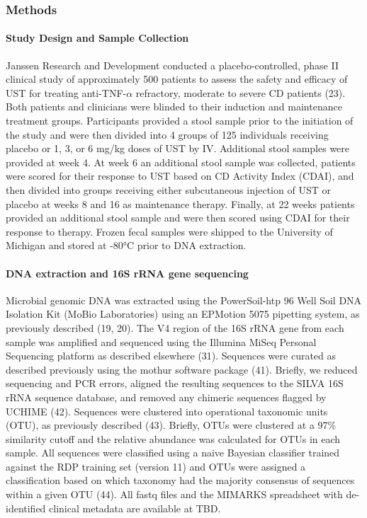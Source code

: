 \documentclass[11pt,]{article}
\let\oldparagraph\paragraph
\renewcommand{\paragraph}[1]{\oldparagraph{#1}\mbox{}}
\begin{document}
\newpage

\subsubsection{Methods}\label{methods}

\paragraph{Study Design and Sample
Collection}\label{study-design-and-sample-collection}

Janssen Research and Development conducted a placebo-controlled, phase
II clinical study of approximately 500 patients to assess the safety and
efficacy of UST for treating anti-TNF-\({\alpha}\) refractory, moderate
to severe CD patients (23). Both patients and clinicians were blinded to
their induction and maintenance treatment groups. Participants provided
a stool sample prior to the initiation of the study and were then
divided into 4 groups of 125 individuals receiving placebo or 1, 3, or 6
mg/kg doses of UST by IV. Additional stool samples were provided at week
4. At week 6 an additional stool sample was collected, patients were
scored for their response to UST based on CD Activity Index (CDAI), and
then divided into groups receiving either subcutaneous injection of UST
or placebo at weeks 8 and 16 as maintenance therapy. Finally, at 22
weeks patients provided an additional stool sample and were then scored
using CDAI for their response to therapy. Frozen fecal samples were
shipped to the University of Michigan and stored at -80°C prior to DNA
extraction.

\paragraph{DNA extraction and 16S rRNA gene
sequencing}\label{dna-extraction-and-16s-rrna-gene-sequencing}

Microbial genomic DNA was extracted using the PowerSoil-htp 96 Well Soil
DNA Isolation Kit (MoBio Laboratories) using an EPMotion 5075 pipetting
system, as previously described (19, 20). The V4 region of the 16S rRNA
gene from each sample was amplified and sequenced using the Illumina
MiSeq Personal Sequencing platform as described elsewhere (31).
Sequences were curated as described previously using the mothur software
package (41). Briefly, we reduced sequencing and PCR errors, aligned the
resulting sequences to the SILVA 16S rRNA sequence database, and removed
any chimeric sequences flagged by UCHIME (42). Sequences were clustered
into operational taxonomic units (OTU), as previously described (43).
Briefly, OTUs were clustered at a 97\% similarity cutoff and the
relative abundance was calculated for OTUs in each sample. All sequences
were classified using a naive Bayesian classifier trained against the
RDP training set (version 11) and OTUs were assigned a classification
based on which taxonomy had the majority consensus of sequences within a
given OTU (44). All fastq files and the MIMARKS spreadsheet with
de-identified clinical metadata are available at TBD.
\end{document}
